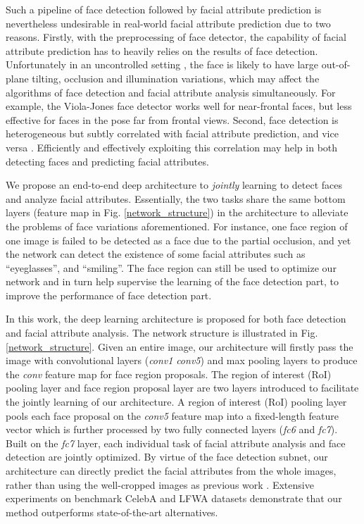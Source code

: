\documentclass[10pt,twocolumn,letterpaper]{article}
\begin{document}
Such a pipeline of face detection followed by facial attribute prediction
is nevertheless undesirable in real-world facial attribute prediction
due to two reasons. Firstly, with the preprocessing of face detector,
the capability of facial attribute prediction has to heavily relies
on the results of face detection. Unfortunately in an uncontrolled
setting \cite{liu2015deep}, the face is likely to have large out-of-plane
tilting, occlusion and illumination variations, which may affect the
algorithms of face detection and facial attribute analysis simultaneously.
For example, the Viola-Jones face detector \cite{viola2001rapid}
works well for near-frontal faces, but less effective for faces in
the pose far from frontal views. Second, face detection is heterogeneous
but subtly correlated with facial attribute prediction, and vice versa \cite{yang2015facial}.
Efficiently and effectively exploiting this correlation may help in
both detecting faces and predicting facial attributes.

We propose an end-to-end deep architecture to \emph{jointly} learning
to detect faces and analyze facial attributes. Essentially, the two
tasks share the same bottom layers (feature map in Fig. \ref{network_structure})
in the architecture to alleviate the problems of face variations aforementioned.
For instance, one face region of one image is failed
to be detected as a face due to the partial occlusion, and yet the network
can detect the existence of some facial attributes such as ``eyeglasses'',
and ``smiling''. The face region can still be used to optimize our
network and in turn help supervise the learning of the face detection
part, to improve the performance of face detection part.

In this work, the deep learning architecture is proposed for both
face detection and facial attribute analysis. The network structure
is illustrated in Fig. \ref{network_structure}. Given an entire image,
our architecture will firstly pass the image with convolutional layers
(\emph{conv1}\textendash{} \emph{conv5}) and max pooling layers to
produce the \emph{conv} feature map for face region proposals. 
The region of interest (RoI) pooling layer and face region proposal layer
are two layers introduced to facilitate the jointly learning
of our architecture. A region of interest (RoI) pooling layer pools
each face proposal on the \emph{conv5} feature map into a fixed-length
feature vector which is further processed by two fully connected layers
(\emph{fc6} and \emph{fc7}). Built on the \emph{fc7} layer, each individual
task of facial attribute analysis and face detection are jointly optimized.
By virtue of the face detection subnet, our architecture can directly
predict the facial attributes from the whole images, rather than
using the well-cropped images as previous work \cite{ranjan2016hyperface,rudd2016moon,wang2016walk}.
Extensive experiments on benchmark CelebA \cite{liu2015deep} and
LFWA \cite{huang2007labeled,liu2015deep} datasets demonstrate that our method outperforms state-of-the-art
alternatives.
\end{document}
